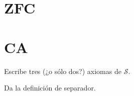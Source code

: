 \documentclass{article}
\begin{document}
\section{ZFC}

\section{CA}
\begin{exercise}
    Escribe tres (¿o sólo dos?) axiomas de \(\mathcal{S}\).
\end{exercise}

\begin{exercise}
    Da la definición de separador.
\end{exercise}
\end{document}
